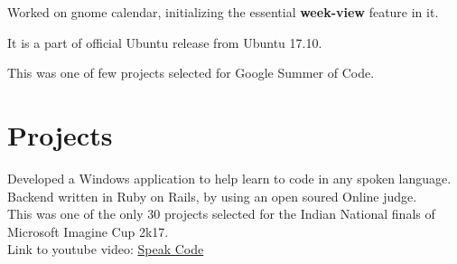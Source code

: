 \documentclass[letterpaper]{deedy-resume} %
\begin{document}
\begin{minipage}[t]{0.66\textwidth}
\sectionspace %



\begin{tightitemize}
\item Worked on gnome calendar, initializing the essential \textbf{week-view} feature in it.
\item It is a part of official Ubuntu release from Ubuntu 17.10.
\item This was one of few projects selected for Google Summer of Code.
\end{tightitemize}

\sectionspace %


\section{Projects}


Developed a Windows application to help learn to code in any spoken language. \\
Backend written in Ruby on Rails, by using an open soured Online judge. \\
This was one of the only 30 projects selected for the Indian National finals of Microsoft Imagine Cup 2k17. \\
Link to youtube video: \href{https://www.youtube.com/watch?v=hO4iSh1bSC0}{Speak Code}

\sectionspace




\end{minipage}
\end{document}
